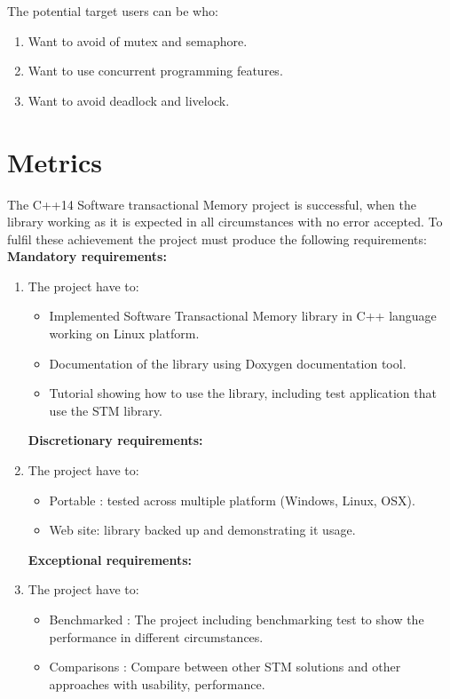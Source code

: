 \documentclass[12pt]{article}
\begin{document}
{\setlength{\parindent}{0cm}
The potential target users can be who:
\begin{enumerate}
\item Want to avoid of mutex and semaphore.
\item Want to use concurrent programming features.
\item Want to avoid deadlock and livelock.
\end{enumerate}
}

\clearpage
\section{Metrics}
The C++14 Software transactional Memory project is successful, when the library working as it is expected in all circumstances with no error accepted. To fulfil these achievement the project must produce the following requirements:\\


\textbf{Mandatory requirements:} 
\begin{enumerate}
\item The project have to:
	\begin{itemize}
	\item Implemented Software Transactional Memory library in C++ language working on Linux platform.
	\item Documentation of the library using Doxygen documentation tool.
	\item Tutorial showing how to use the library, including test application that use the STM library.
	\end{itemize}


\textbf{Discretionary requirements:} 

\item The project have to:
	\begin{itemize}
	\item Portable : tested across multiple platform (Windows, Linux, OSX).
	\item Web site: library backed up and demonstrating it usage.
	\end{itemize}

\clearpage
\textbf{Exceptional requirements:} 

\item The project have to:
	\begin{itemize}
	\item Benchmarked : The project including benchmarking test to show the performance in different circumstances.
	\item Comparisons : Compare between other STM solutions and other approaches with usability, performance.
	\end{itemize}
\end{enumerate}
\end{document}
